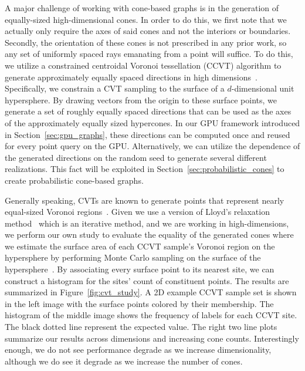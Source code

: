 A major challenge of working with cone-based graphs is in the generation of equally-sized high-dimensional cones.
%
In order to do this, we first note that we actually only require the axes of said cones and not the interiors or boundaries.
%
Secondly, the orientation of these cones is not prescribed in any prior work, so any set of uniformly spaced rays emanating from a point will suffice.
%
To do this, we utilize a constrained centroidal Voronoi tessellation (CCVT) algorithm to generate approximately equally spaced directions in high dimensions~\cite{DuGunzburgerJu2003}.
%
Specifically, we constrain a CVT sampling to the surface of a $d$-dimensional unit hypersphere.
%
By drawing vectors from the origin to these surface points, we generate a set of roughly equally spaced directions that can be used as the axes of the approximately equally sized hypercones.
%
In our GPU framework introduced in Section~\ref{sec:gpu_graphs}, these directions can be computed once and reused for every point query on the GPU.
%
Alternatively, we can utilize the dependence of the generated directions on the random seed to generate several different realizations.
%
This fact will be exploited in Section~\ref{sec:probabilistic_cones} to create probabilistic cone-based graphs.

Generally speaking, CVTs are known to generate points that represent nearly equal-sized Voronoi
regions~\cite{HesseSloanWomersley2015,PeyreCohen2004}.
%
Given we use a version of Lloyd's relaxation method~\cite{DuGunzburgerJu2003} which is an iterative method, and we are working in high-dimensions, we perform our own study to evaluate the equality of the generated cones where we estimate the surface area of each CCVT sample's Voronoi region on the hypersphere by performing Monte Carlo sampling on the surface of the hypersphere~\cite{HarmanLacko2010,HicksWheeling1959}.
%
By associating every surface point to its nearest site, we can construct a histogram for the sites' count of constituent points.
%
The results are summarized in Figure~\ref{fig:cvt_study}.
%
A 2D example CCVT sample set is shown in the left image with the surface points colored by their membership.
%
The histogram of the middle image shows the frequency of labels for each CCVT site.
%
The black dotted line represent the expected value.
%
The right two line plots summarize our results across dimensions and increasing cone counts.
%
Interestingly enough, we do not see performance degrade as we increase dimensionality, although we do see it degrade as we increase the number of cones.

